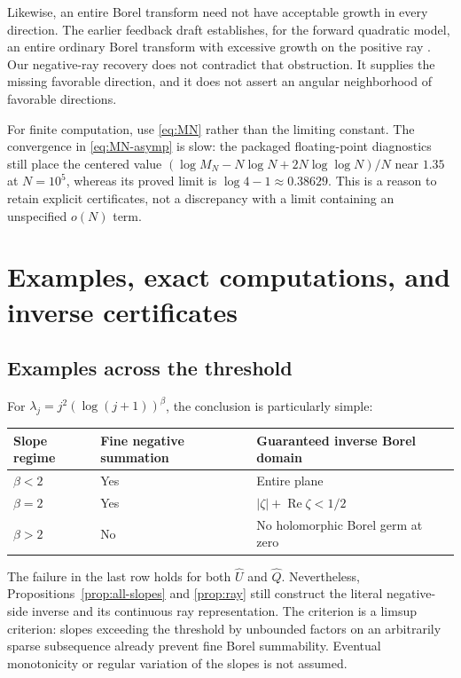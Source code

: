 \documentclass[11pt,a4paper]{article}
\numberwithin{equation}{section}
\theoremstyle{definition}
\theoremstyle{remark}
\newcommand{\U}{\widehat U}
\newcommand{\Q}{\widehat Q}
\newcommand{\Ree}{\operatorname{Re}}
\begin{document}
Likewise, an entire Borel transform need not have acceptable growth in
every direction.  The earlier feedback draft establishes, for the forward
quadratic model, an entire ordinary Borel transform with excessive growth
on the positive ray \cite{feedback}.  Our negative-ray recovery does not
contradict that obstruction.  It supplies the missing favorable direction,
and it does not assert an angular neighborhood of favorable directions.

For finite computation, use \eqref{eq:MN} rather than the limiting
constant.  The convergence in \eqref{eq:MN-asymp} is slow: the packaged
floating-point diagnostics still place the centered value
$(\log M_N-N\log N+2N\log\log N)/N$ near $1.35$ at $N=10^5$, whereas its
proved limit is $\log4-1\approx0.38629$.  This is a reason to retain
explicit certificates, not a discrepancy with a limit containing an
unspecified $o(N)$ term.

\section{Examples, exact computations, and inverse certificates}
\label{sec:verification}

\subsection{Examples across the threshold}
For $\lambda_j=j^2(\log(j+1))^\beta$, the conclusion is particularly simple:
\begin{center}
\begin{tabular}{@{}lll@{}}
\toprule
Slope regime & Fine negative summation & Guaranteed inverse Borel domain\\
\midrule
$\beta<2$ & Yes & Entire plane\\
$\beta=2$ & Yes & $|\zeta|+\Ree\zeta<1/2$\\
$\beta>2$ & No & No holomorphic Borel germ at zero\\
\bottomrule
\end{tabular}
\end{center}
The failure in the last row holds for both $\U$ and $\Q$.  Nevertheless,
Propositions~\ref{prop:all-slopes} and \ref{prop:ray} still construct the
literal negative-side inverse and its continuous ray representation.
The criterion is a limsup criterion: slopes exceeding the threshold by
unbounded factors on an arbitrarily sparse subsequence already prevent
fine Borel summability.  Eventual monotonicity or regular variation of the
slopes is not assumed.
\end{document}
